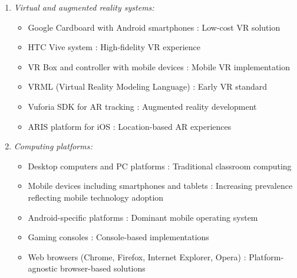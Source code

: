 \documentclass[a4paper,fleqn]{cas-sc}
\begin{document}
\begin{enumerate}[noitemsep]
	\item 
\textit{Virtual and augmented reality systems:}
\begin{itemize}[noitemsep]
 \item Google Cardboard with Android smartphones \citep{5kazanidis2018alpha}: Low-cost VR solution
 \item HTC Vive system \citep{10Huaman2019220}: High-fidelity VR experience
 \item VR Box and controller with mobile devices \citep{77Ramansyah2021}: Mobile VR implementation
 \item VRML (Virtual Reality Modeling Language) \citep{1Barbatsis201159}: Early VR standard
 \item Vuforia SDK for AR tracking \citep{40Kuran2018}: Augmented reality development
 \item ARIS platform for iOS \citep{80gottlieb2018your}: Location-based AR experiences
\end{itemize}

	\item 
\textit{Computing platforms:}
\begin{itemize}[noitemsep]
 \item Desktop computers and PC platforms \citep{3Watson2011466, 8Yu2014, 23Zin2009322, 51Ardito2007, 74Fendt2019}: Traditional classroom computing
 \item Mobile devices including smartphones and tablets \citep{4Cruz2017, 11Ternblad2023115, 19Chou2019, 21Ghulamani2017, 32Cheng20241718, 40Kuran2018, 49Huizenga2007127, 58Shih2015173, 59Kee2014270, 69Wong2017150, 70Hou201519, 80gottlieb2018your}: Increasing prevalence reflecting mobile technology adoption
 \item Android-specific platforms \citep{4Cruz2017, 5kazanidis2018alpha, 80gottlieb2018your}: Dominant mobile operating system
 \item Gaming consoles \citep{23Zin2009322, 38Mercik2024}: Console-based implementations
 \item Web browsers (Chrome, Firefox, Internet Explorer, Opera) \citep{6Czerwinski2018}: Platform-agnostic browser-based solutions
\end{itemize}


\end{enumerate}
\end{document}
